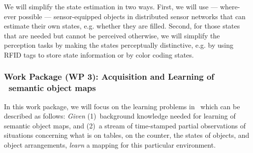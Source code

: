 \begin{description}
  We will simplify the state estimation in two ways. First, we will use
  --- where-ever possible --- sensor-equipped objects in distributed sensor
  networks that can estimate their own states, e.g. whether they are
  filled.
  Second, for those states that are needed but cannot be perceived
  otherwise, we will simplify the perception tasks by making the states
  perceptually distinctive, e.g. by using RFID tags to store state
  information or by color coding states.
\end{description}

\subsubsection{Work Package (WP 3): Acquisition and Learning of \ksem\ semantic object maps}
\label{sec:wp3}
In this work package, we will focus on the learning problems in 
\ksem\ which can be described as follows: \emph{Given} (1)~background
knowledge needed for learning of semantic object maps,  and (2)~a stream
of time-stamped partial observations of situations concerning what is
on tables, on the counter, the states of objects, and object
arrangements, \emph{learn} a mapping for this particular environment.

